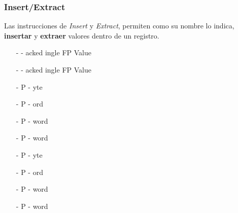 \documentclass[aspectratio=169]{beamer}
\begin{document}
\begin{frame}[fragile,t]
	\frametitle{Insert/Extract}
	Las instrucciones de \emph{Insert} y \emph{Extract}, permiten como su nombre lo indica,\\
	\textbf{insertar} y \textbf{extraer} valores dentro de un registro.
	\vskip 5pt
	\pause
	\begin{itemize}
	 \item[-] {\color{a}{INSERT}}{\color{r}{P}}{\color{v}{S}}  - {\color{a}{Insert}} {\color{r}{P}}acked {\color{v}{S}}ingle FP Value
	 \item[-] {\color{a}{EXTRACT}}{\color{r}{P}}{\color{v}{S}} - {\color{a}{Extract}} {\color{r}{P}}acked {\color{v}{S}}ingle FP Value
	\end{itemize}
	\begin{itemize}
	 \item[-] P{\color{a}{INSR}}{\color{v}{B}} - {\color{a}{Insert}} {\color{v}{B}}yte
	 \item[-] P{\color{a}{INSR}}{\color{v}{W}} - {\color{a}{Insert}} {\color{v}{W}}ord
	 \item[-] P{\color{a}{INSR}}{\color{v}{D}} - {\color{a}{Insert}} {\color{v}{D}}word
	 \item[-] P{\color{a}{INSR}}{\color{v}{Q}} - {\color{a}{Insert}} {\color{v}{Q}}word
	\end{itemize}
	\begin{itemize}
	 \item[-] P{\color{a}{EXTR}}{\color{v}{B}} - {\color{a}{Extract}} {\color{v}{B}}yte
	 \item[-] P{\color{a}{EXTR}}{\color{v}{W}} - {\color{a}{Extract}} {\color{v}{W}}ord
	 \item[-] P{\color{a}{EXTR}}{\color{v}{D}} - {\color{a}{Extract}} {\color{v}{D}}word
	 \item[-] P{\color{a}{EXTR}}{\color{v}{Q}} - {\color{a}{Extract}} {\color{v}{Q}}word
	\end{itemize}
\end{frame}
\end{document}

